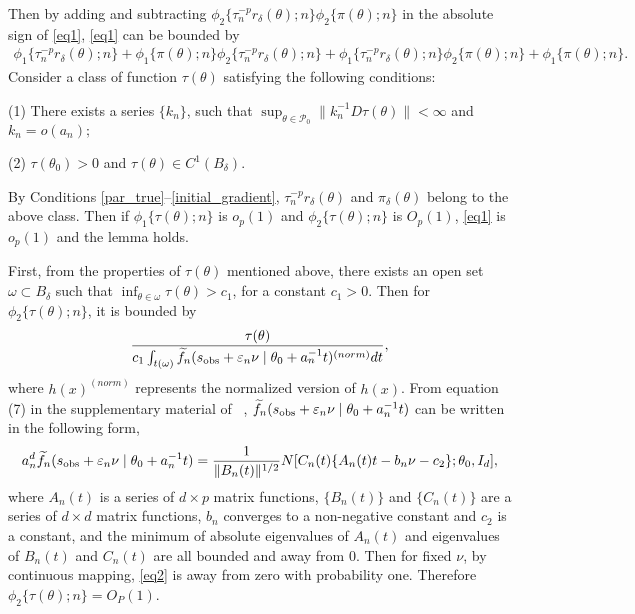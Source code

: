 \documentclass[9pt]{article}
\theoremstyle{remark}
\begin{document}
	Then by adding and subtracting $\phi_{2}\{\tau_{n}^{-p}r_{\delta}(\theta);n\}\phi_{2}\{\pi(\theta);n\}$
	in the absolute sign of \eqref{eq1}, \eqref{eq1} can be bounded
	by 
	\begin{eqnarray*}
		\phi_{1}\{\tau_{n}^{-p}r_{\delta}(\theta);n\}+\phi_{1}\{\pi(\theta);n\}\phi_{2}\{\tau_{n}^{-p}r_{\delta}(\theta);n\}+\phi_{1}\{\tau_{n}^{-p}r_{\delta}(\theta);n\}\phi_{2}\{\pi(\theta);n\}+\phi_{1}\{\pi(\theta);n\}.
	\end{eqnarray*}
	Consider a class of function $\tau(\theta)$ satisfying the following
	conditions: 
	
	(1) There exists a series $\{k_{n}\}$, such that $\sup_{\theta\in\mathcal{P}_{0}}\|k_{n}^{-1}D\tau(\theta)\|<\infty$
	and $k_{n}=o(a_{n});$ 
	
    (2)	$\tau(\theta_{0})>0$ and $\tau(\theta)\in C^{1}(B_{\delta}).$ 
	
	
	By Conditions \ref{par_true}--\ref{initial_gradient}, $\tau_{n}^{-p}r_{\delta}(\theta)$
	and $\pi_{\delta}(\theta)$ belong to the above class. Then if $\phi_{1}\{\tau(\theta);n\}$
	is $o_{p}(1)$ and $\phi_{2}\{\tau(\theta);n\}$ is $O_{p}(1)$, \eqref{eq1}
	is $o_{p}(1)$ and the lemma holds. 
	
	First, from the properties of $\tau(\theta)$ mentioned above, there exists an open set $\omega\subset B_{\delta}$
	such that $\inf_{\theta\in\omega}\tau(\theta)>c_{1}$, for a constant
	$c_{1}>0$. Then for $\phi_{2}\{\tau(\theta);n\}$, it is bounded
	by 
	\[
	\frac{\tau(\theta)}{c_{1}\int_{t(\omega)}\widetilde{f}_{n}(s_{{\rm obs}}+\varepsilon_{n}\nu\mid\theta_{0}+a_{n}^{-1}t)^{(norm)}dt},
	\]
	where $h(x)^{(norm)}$ represents the normalized version of $h(x)$.
	From equation (7) in the supplementary material of ~\cite{Li2016},
	$\widetilde{f}_{n}(s_{{\rm obs}}+\varepsilon_{n}\nu\mid\theta_0+a_{n}^{-1}t)$
	can be written in the following form, 
	\begin{eqnarray}
	a_{n}^{d}\widetilde{f}_{n}(s_{{\rm obs}}+\varepsilon_{n}\nu\mid\theta_0+a_{n}^{-1}t)=\frac{1}{\|B_{n}(t)\|^{1/2}}N[C_{n}(t)\{A_{n}(t)t-b_{n}\nu-c_{2}\};\theta_0,I_{d}],\label{eq2}
	\end{eqnarray}
	where $A_{n}(t)$ is a series of $d\times p$ matrix functions, $\{B_{n}(t)\}$
	and $\{C_{n}(t)\}$ are a series of $d\times d$ matrix functions,
	$b_{n}$ converges to a non-negative constant and $c_{2}$ is a constant,
	and the minimum of absolute eigenvalues of $A_{n}(t)$ and eigenvalues
	of $B_{n}(t)$ and $C_{n}(t)$ are all bounded and away from $0$.
	Then for fixed $\nu$, by continuous mapping, \eqref{eq2} is away
	from zero with probability one. Therefore $\phi_{2}\{\tau(\theta);n\}=O_{P}(1)$.
	
\end{document}
